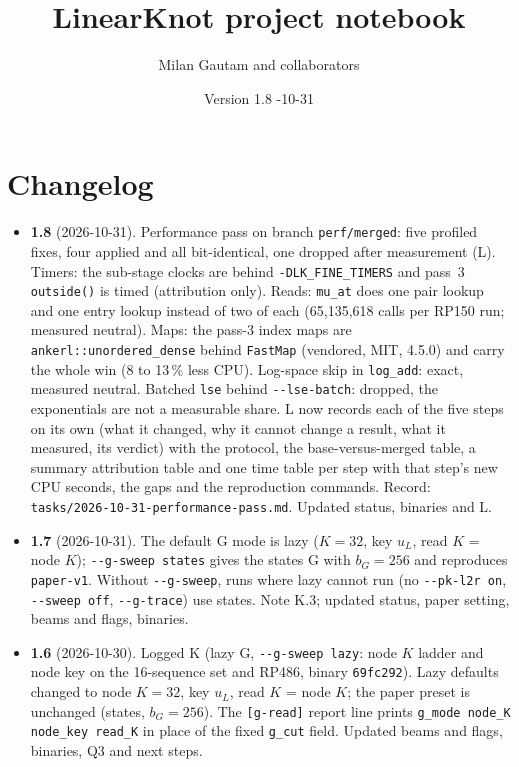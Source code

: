 \documentclass[11pt]{article}
\title{LinearKnot project notebook}
\author{Milan Gautam and collaborators}
\date{Version 1.8 \quad 2026-10-31}
\begin{document}
\maketitle

\section*{Changelog}
\begin{itemize}[leftmargin=*]
  \item \textbf{1.8} (2026-10-31). Performance pass on branch \texttt{perf/merged}: five profiled fixes, four applied and all bit-identical, one dropped after measurement (L). Timers: the sub-stage clocks are behind \texttt{-DLK\_FINE\_TIMERS} and pass~3 \texttt{outside()} is timed (attribution only). Reads: \texttt{mu\_at} does one pair lookup and one entry lookup instead of two of each (65{,}135{,}618 calls per RP150 run; measured neutral). Maps: the pass-3 index maps are \texttt{ankerl::unordered\_dense} behind \texttt{FastMap} (vendored, MIT, 4.5.0) and carry the whole win (8 to 13\,\% less CPU). Log-space skip in \texttt{log\_add}: exact, measured neutral. Batched \texttt{lse} behind \texttt{-{}-lse-batch}: dropped, the exponentials are not a measurable share. L now records each of the five steps on its own (what it changed, why it cannot change a result, what it measured, its verdict) with the protocol, the base-versus-merged table, a summary attribution table and one time table per step with that step's new CPU seconds, the gaps and the reproduction commands. Record: \texttt{tasks/2026-10-31-performance-pass.md}. Updated status, binaries and L.
  \item \textbf{1.7} (2026-10-31). The default G mode is lazy ($K=32$, key $u_L$, read $K$ = node $K$); \texttt{-{}-g-sweep states} gives the states G with $b_G=256$ and reproduces \texttt{paper-v1}. Without \texttt{-{}-g-sweep}, runs where lazy cannot run (no \texttt{-{}-pk-l2r on}, \texttt{-{}-sweep off}, \texttt{-{}-g-trace}) use states. Note K.3; updated status, paper setting, beams and flags, binaries.
  \item \textbf{1.6} (2026-10-30). Logged K (lazy G, \texttt{-{}-g-sweep lazy}: node $K$ ladder and node key on the 16-sequence set and RP486, binary \texttt{69fc292}). Lazy defaults changed to node $K=32$, key $u_L$, read $K$ = node $K$; the paper preset is unchanged (states, $b_G=256$). The \texttt{[g-read]} report line prints \texttt{g\_mode node\_K node\_key read\_K} in place of the fixed \texttt{g\_cut} field. Updated beams and flags, binaries, Q3 and next steps.

\end{itemize}
\end{document}
